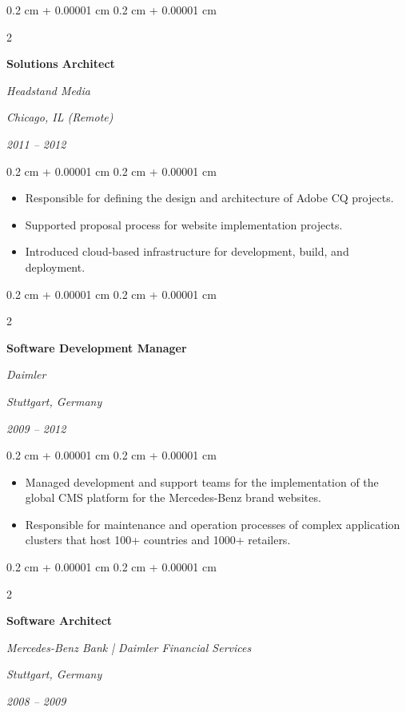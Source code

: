 \documentclass[10pt, a4paper]{article}
\newenvironment{highlights}{
    \begin{itemize}[
        topsep=0.10 cm,
        parsep=0.10 cm,
        partopsep=0pt,
        itemsep=0pt,
        leftmargin=0.4 cm + 10pt
    ]
}{
    \end{itemize}
} %
\newenvironment{onecolentry}{
    \begin{adjustwidth}{
        0.2 cm + 0.00001 cm
    }{
        0.2 cm + 0.00001 cm
    }
}{
    \end{adjustwidth}
} %
\newenvironment{twocolentry}[2][6cm]{ %
    \onecolentry
    \def\secondColumn{#2}
    \setcolumnwidth{\fill, #1} %
    \begin{paracol}{2}
}{
    \switchcolumn \raggedleft \secondColumn
    \end{paracol}
    \endonecolentry
} %
\begin{document}
%
%
\begin{twocolentry}{
        \textit{Chicago, IL (Remote)}

        \textit{2011 – 2012}}
    \textbf{Solutions Architect}

    \textit{Headstand Media}
\end{twocolentry}

\vspace{0.10 cm}
\begin{onecolentry}
    \begin{highlights}
        \item Responsible for defining the design and architecture of Adobe CQ projects.
        \item Supported proposal process for website implementation projects.
        \item Introduced cloud-based infrastructure for development, build, and deployment.
    \end{highlights}
\end{onecolentry}

\vspace{0.20 cm}



%
%
\begin{twocolentry}{
        \textit{Stuttgart, Germany}

        \textit{2009 – 2012}}
    \textbf{Software Development Manager}

    \textit{Daimler}
\end{twocolentry}

\vspace{0.10 cm}
\begin{onecolentry}
    \begin{highlights}
        \item Managed development and support teams for the implementation of the global CMS platform for the Mercedes-Benz brand websites.
        \item Responsible for maintenance and operation processes of complex application clusters that host 100+ countries and 1000+ retailers.
    \end{highlights}
\end{onecolentry}

\vspace{0.20 cm}



%
%
\begin{twocolentry}{
        \textit{Stuttgart, Germany}

        \textit{2008 – 2009}}
    \textbf{Software Architect}

    \textit{Mercedes-Benz Bank | Daimler Financial Services}
\end{twocolentry}
\end{document}
